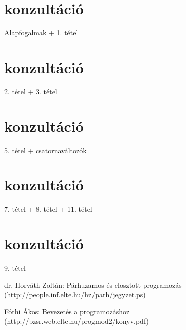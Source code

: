 \documentclass[12pt]{article}
\begin{document}
	
	\newpage
	\section{konzultáció}
	Alapfogalmak + 1. tétel
	
	\newpage
	\section{konzultáció}
	2. tétel + 3. tétel
	
	\newpage
	\section{konzultáció}
	5. tétel + csatornaváltozók
	
	\newpage
	\section{konzultáció}
	7. tétel + 8. tétel + 11. tétel
	\newpage
	\section{konzultáció}
	9. tétel
	
	\begin{thebibliography}{9}
		\raggedright
		dr. Horváth Zoltán: Párhuzamos és elosztott programozás (http://people.inf.elte.hu/hz/parh/jegyzet.ps)
		
		Fóthi Ákos: Bevezetés a programozáshoz (http://bzsr.web.elte.hu/progmod2/konyv.pdf)
		
	\end{thebibliography}
\end{document}
